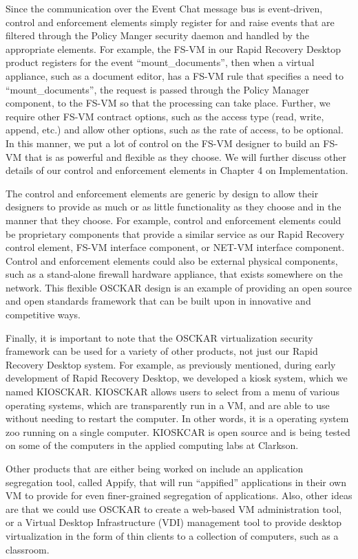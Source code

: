 Since the communication over the Event Chat message bus is event-driven, control and enforcement elements simply register for and raise events that are filtered through the Policy Manger security daemon and handled by the appropriate elements. For example, the FS-VM in our Rapid Recovery Desktop product registers for the event ``mount\_documents'', then when a virtual appliance, such as a document editor, has a FS-VM rule that specifies a need to ``mount\_documents'', the request is passed through the Policy Manager component, to the FS-VM so that the processing can take place. Further, we require other FS-VM contract options, such as the access type (read, write, append, etc.) and allow other options, such as the rate of access, to be optional. In this manner, we put a lot of control on the FS-VM designer to build an FS-VM that is as powerful and flexible as they choose. We will further discuss other details of our control and enforcement elements in Chapter 4 on Implementation.

The control and enforcement elements are generic by design to allow their designers to provide as much or as little functionality as they choose and in the manner that they choose. For example, control and enforcement elements could be proprietary components that provide a similar service as our Rapid Recovery control element, FS-VM interface component, or NET-VM interface component. Control and enforcement elements could also be external physical components, such as a stand-alone firewall hardware appliance, that exists somewhere on the network. This flexible OSCKAR design is an example of providing an open source and open standards framework that can be built upon in innovative and competitive ways.

Finally, it is important to note that the OSCKAR virtualization security framework can be used for a variety of other products, not just our Rapid Recovery Desktop system. For example, as previously mentioned, during early development of Rapid Recovery Desktop, we developed a kiosk system, which we named KIOSCKAR. KIOSCKAR allows users to select from a menu of various operating systems, which are transparently run in a VM, and are able to use without needing to restart the computer. In other words, it is a operating system zoo running on a single computer. KIOSKCAR is open source and is being tested on some of the computers in the applied computing labs at Clarkson.

Other products that are either being worked on include an application segregation tool, called Appify, that will run ``appified'' applications in their own VM to provide for even finer-grained segregation of applications. Also, other ideas are that we could use OSCKAR to create a web-based VM administration tool, or a Virtual Desktop Infrastructure (VDI) management tool to provide desktop virtualization in the form of thin clients to a collection of computers, such as a classroom.

